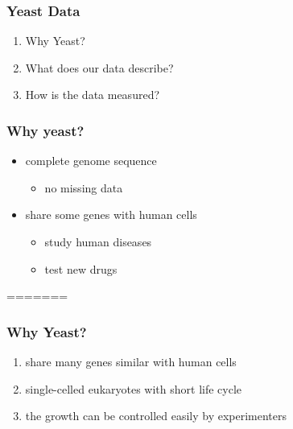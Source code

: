 \begin{frame}\frametitle{Yeast Data}
    \begin{enumerate}
        \item Why Yeast?
        \item What does our data describe?
        \item How is the data measured? 
    \end{enumerate}
\end{frame}

\begin{frame}\frametitle{Why yeast?}
    \begin{itemize}
    	\item complete genome sequence  
		\begin{itemize}
			\item no missing data 
		\end{itemize}    	
		\item share some genes with human cells   
		\begin{itemize}
			\item study human diseases
			\item test new drugs
		\end{itemize}		     

        
    \end{itemize}
\end{frame}

=======
\begin{frame}\frametitle{Why Yeast?}
    \begin{enumerate}
        \item share many genes similar with human cells
        
        \item single-celled eukaryotes with short life cycle
        
        \item the growth can be controlled easily by experimenters
    \end{enumerate}
\end{frame}

